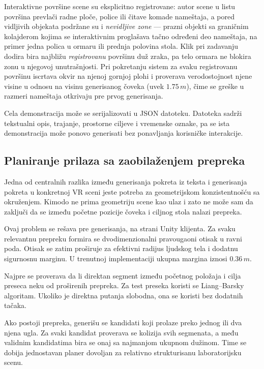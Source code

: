 \documentclass{article}
\begin{document}
Interaktivne površine scene su eksplicitno registrovane: autor scene u listu površina prevlači radne ploče, police ili čitave komade nameštaja, a pored vidljivih objekata podržane su i \emph{nevidljive zone} --- prazni objekti sa graničnim kolajderom kojima se interaktivnim proglašava tačno određeni deo nameštaja, na primer jedna polica u ormaru ili prednja polovina stola. Klik pri zadavanju dodira bira najbližu \emph{registrovanu} površinu duž zraka, pa telo ormara ne blokira zonu u njegovoj unutrašnjosti. Pri pokretanju sistem za svaku registrovanu površinu iscrtava okvir na njenoj gornjoj plohi i proverava verodostojnost njene visine u odnosu na visinu generisanog čoveka (uvek $1.75\,m$), čime se greške u razmeri nameštaja otkrivaju pre prvog generisanja.

Cela demonstracija može se serijalizovati u JSON datoteku. Datoteka sadrži tekstualni opis, trajanje, prostorne ciljeve i vremenske oznake, pa se ista demonstracija može ponovo generisati bez ponavljanja korisničke interakcije.

\subsection{Planiranje prilaza sa zaobilaženjem prepreka}
\label{sec:planning}

Jedna od centralnih razlika između generisanja pokreta iz teksta i generisanja pokreta u konkretnoj VR sceni jeste potreba za geometrijskom konzistentnošću sa okruženjem. Kimodo ne prima geometriju scene kao ulaz i zato ne može sam da zaključi da se između početne pozicije čoveka i ciljnog stola nalazi prepreka.

Ovaj problem se rešava pre generisanja, na strani Unity klijenta. Za svaku relevantnu prepreku formira se dvodimenzionalni pravougaoni otisak u ravni poda. Otisak se zatim proširuje za efektivni radijus ljudskog tela i dodatnu sigurnosnu marginu. U trenutnoj implementaciji ukupna margina iznosi $0.36\,m$.

Najpre se proverava da li direktan segment između početnog položaja i cilja preseca neku od proširenih prepreka. Za test preseka koristi se Liang--Barsky algoritam. Ukoliko je direktna putanja slobodna, ona se koristi bez dodatnih tačaka.

Ako postoji prepreka, generišu se kandidati koji prolaze preko jednog ili dva njena ugla. Za svaki kandidat proverava se kolizija svih segmenata, a među validnim kandidatima bira se onaj sa najmanjom ukupnom dužinom. Time se dobija jednostavan planer dovoljan za relativno strukturisanu laboratorijsku scenu.
\end{document}
